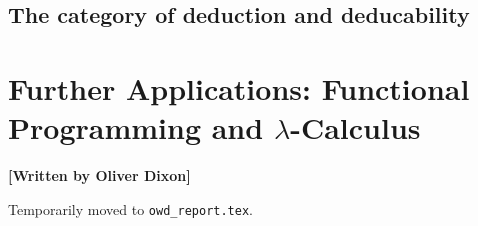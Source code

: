\documentclass[10pt,a4paper,reqno]{amsart}
\numberwithin{figure}{section}
\begin{document}
\subsection{The category of deduction and deducability}


\section{Further Applications: %
        Functional Programming and \texorpdfstring{$\lambda$}{Lambda}-Calculus}
\begin{flushright}
        \textbf{[Written by Oliver Dixon]}
\end{flushright}

\noindent Temporarily moved to \texttt{owd\_report.tex}.
\end{document}
